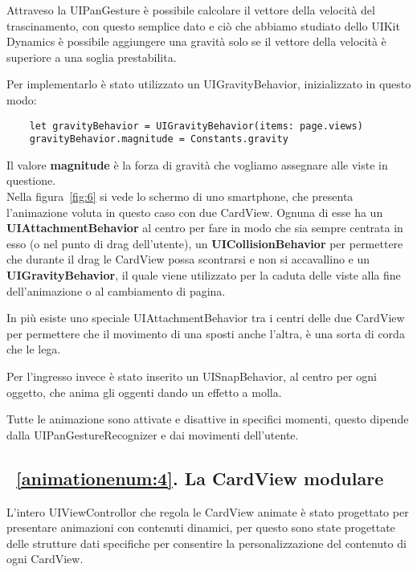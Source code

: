Attraveso la UIPanGesture è possibile calcolare il vettore della velocità del trascinamento,
con questo semplice dato e ciò che abbiamo studiato dello UIKit Dynamics è possibile aggiungere una gravità solo se
il vettore della velocità è superiore a una soglia prestabilita.

Per implementarlo è stato utilizzato un UIGravityBehavior, inizializzato in questo modo:

\begin{verbatim}
    let gravityBehavior = UIGravityBehavior(items: page.views)
    gravityBehavior.magnitude = Constants.gravity
\end{verbatim}

Il valore \textbf{magnitude} è la forza di gravità che vogliamo
assegnare alle viste in questione. \\

Nella figura~\ref{fig:6} si vede lo schermo di uno smartphone, che presenta l'animazione
voluta in questo caso con due CardView. Ognuna di esse ha un \textbf{UIAttachmentBehavior} al
centro per fare in modo che sia sempre centrata in esso (o nel punto di drag dell'utente),
un \textbf{UICollisionBehavior} per permettere che durante il drag le CardView possa scontrarsi e non si accavallino e un \textbf{UIGravityBehavior}, il quale 
viene utilizzato per la caduta delle viste alla fine dell'animazione o al cambiamento di pagina.

In più esiste uno speciale UIAttachmentBehavior tra i centri delle due CardView per permettere che il movimento di una
sposti anche l'altra, è una sorta di corda che le lega.

Per l'ingresso invece è stato inserito un UISnapBehavior, al centro per ogni oggetto, che anima 
gli oggenti dando un effetto a molla.

Tutte le animazione sono attivate e disattive in specifici momenti, questo dipende 
dalla UIPanGestureRecognizer e dai movimenti dell'utente.

\subsection{~\ref{animationenum:4}. La CardView modulare}

L'intero UIViewControllor che regola le CardView animate è stato progettato per presentare 
animazioni con contenuti dinamici, per questo sono state progettate delle strutture dati specifiche per consentire la personalizzazione
del contenuto di ogni CardView. 


